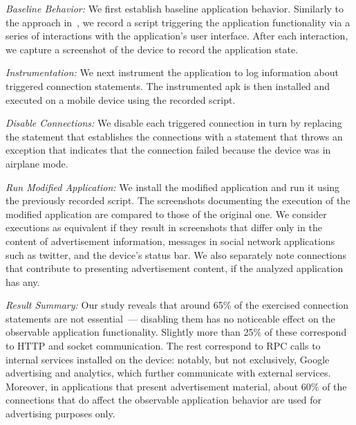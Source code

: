 \vspace{0.05in}
\noindent\emph{Baseline Behavior:} We first establish baseline
application behavior.  Similarly to the approach
in~\cite{Hornyack:Han:Jung:Schechter:Wetherall:CCS11}, we record a
script triggering the application functionality via a series of
interactions with the application's user interface.  After each
interaction, we capture a screenshot of the device to record the
application state.

\vspace{0.05in}
\noindent\emph{Instrumentation:} We next instrument the application to log information
about triggered connection statements. The instrumented apk is then
installed and executed on a mobile device using the recorded script.

\vspace{0.05in}
\noindent\emph{Disable Connections:} We disable each triggered connection
in turn by replacing the statement that establishes the connections 
with a statement that throws an exception that indicates that the
connection failed because the device was in airplane mode. 

\vspace{0.05in}
\noindent\emph{Run Modified Application:} We install the modified
application and run it using the previously recorded script. The
screenshots documenting the execution of the modified application are
compared to those of the original one. We consider executions as
equivalent if they result in screenshots that differ only in the
content of advertisement information, messages in social network
applications such as twitter, and the device's status bar.  We also
separately note connections that contribute to presenting
advertisement content, if the analyzed application has any.

\vspace{0.05in}
\noindent\emph{Result Summary:} Our study reveals that around 65\% of
the exercised connection statements are not essential~--- disabling
them has no noticeable effect on the observable application
functionality.  Slightly more than 25\% of these correspond to HTTP
and socket communication. The rest correspond to RPC calls to internal
services installed on the device: notably, but not exclusively, Google
advertising and analytics, which further communicate with external
services.  Moreover, in applications that present advertisement
material, about 60\% of the connections that do affect the observable
application behavior are used for advertising purposes only.

